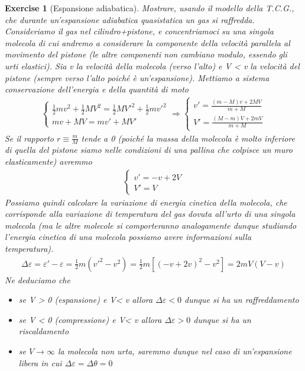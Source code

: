 \documentclass[10pt,a4paper]{article}
\newtheorem{exercise}{Exercise}
\begin{document}
\begin{exercise}[Espansione adiabatica]
	Mostrare, usando il modello della T.C.G., che durante un’espansione adiabatica quasistatica
	un gas si raffredda.\\
	Consideriamo il gas nel cilindro+pistone, e concentriamoci su una singola molecola di cui andremo	a considerare la componente della velocità parallela al movimento del pistone (le altre componenti non cambiano modulo, essendo gli urti elastici). Sia v la velocità della molecola (verso l’alto) e V < v la velocità del pistone (sempre verso l’alto poiché è un'espansione). Mettiamo a sistema conservazione dell'energia e della quantità di moto
	\begin{align*}
		\begin{cases}
			\frac{1}{2} m v^2 + \frac{1}{2}M V^2 = \frac{1}{2}M V'^2+\frac{1}{2}m v'^2\\
			m v + M V = m v' + M V'
		\end{cases} \Rightarrow 
		\begin{cases}
			v' = \frac{(m - M) v + 2 M V}{m + M}\\
			V' = \frac{(M - m)V + 2m V}{m + M}
		\end{cases}
	\end{align*}
Se il rapporto \(r \equiv \frac{m}{M}\) tende a 0 (poiché la massa della molecola è molto inferiore di quella del pistone siamo nelle condizioni di una pallina che colpisce un muro elasticamente) avremmo
\begin{align*}
	\begin{cases}
		v' = -v + 2 V\\
		V' = V
	\end{cases}
\end{align*}
Possiamo quindi calcolare la variazione di energia cinetica della molecola, che corrisponde alla variazione di temperatura del gas dovuta all'urto di una singola molecola (ma le altre molecole si comporteranno analogamente dunque studiando l'energia cinetica di una molecola possiamo avere informazioni sulla temperatura). 
\begin{align*}
	\Delta\varepsilon = \varepsilon' - \varepsilon = \frac{1}{2} m (v'^2 - v^2) = \frac{1}{2} m [(-v+2v)^2 - v^2] = 2 m V (V - v)
\end{align*}
Ne deduciamo che 
\begin{itemize}
	\item se V > 0 (espansione) e V< v allora $\Delta\varepsilon < 0$ dunque si ha un raffreddamento
	\item se V < 0 (compressione) e V< v allora $\Delta\varepsilon > 0$ dunque si ha un riscaldamento
	\item se $V\to\infty$ la molecola non urta, saremmo dunque nel caso di un'espansione libera in cui  $\Delta\varepsilon = \Delta \theta = 0$
\end{itemize}
\end{exercise}
\end{document}

